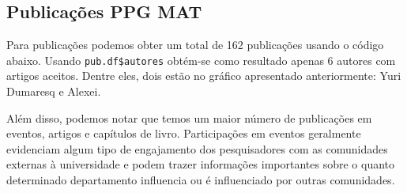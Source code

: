 \documentclass[]{article}
\newenvironment{Shaded}{\begin{snugshade}}{\end{snugshade}}
\newcommand{\KeywordTok}[1]{\textcolor[rgb]{0.13,0.29,0.53}{\textbf{#1}}}
\newcommand{\DataTypeTok}[1]{\textcolor[rgb]{0.13,0.29,0.53}{#1}}
\newcommand{\DecValTok}[1]{\textcolor[rgb]{0.00,0.00,0.81}{#1}}
\newcommand{\FloatTok}[1]{\textcolor[rgb]{0.00,0.00,0.81}{#1}}
\newcommand{\StringTok}[1]{\textcolor[rgb]{0.31,0.60,0.02}{#1}}
\newcommand{\ControlFlowTok}[1]{\textcolor[rgb]{0.13,0.29,0.53}{\textbf{#1}}}
\newcommand{\OperatorTok}[1]{\textcolor[rgb]{0.81,0.36,0.00}{\textbf{#1}}}
\newcommand{\NormalTok}[1]{#1}
\begin{document}
\subsection{Publicações PPG MAT}\label{publicacoes-ppg-mat}

Para publicações podemos obter um total de 162 publicações usando o
código abaixo. Usando \texttt{pub.df\$autores} obtém-se como resultado
apenas 6 autores com artigos aceitos. Dentre eles, dois estão no gráfico
apresentado anteriormente: Yuri Dumaresq e Alexei.

Além disso, podemos notar que temos um maior número de publicações em
eventos, artigos e capítulos de livro. Participações em eventos
geralmente evidenciam algum tipo de engajamento dos pesquisadores com as
comunidades externas à universidade e podem trazer informações
importantes sobre o quanto determinado departamento influencia ou é
influenciado por outras comunidades.

\begin{Shaded}
\end{Shaded}
\end{document}
